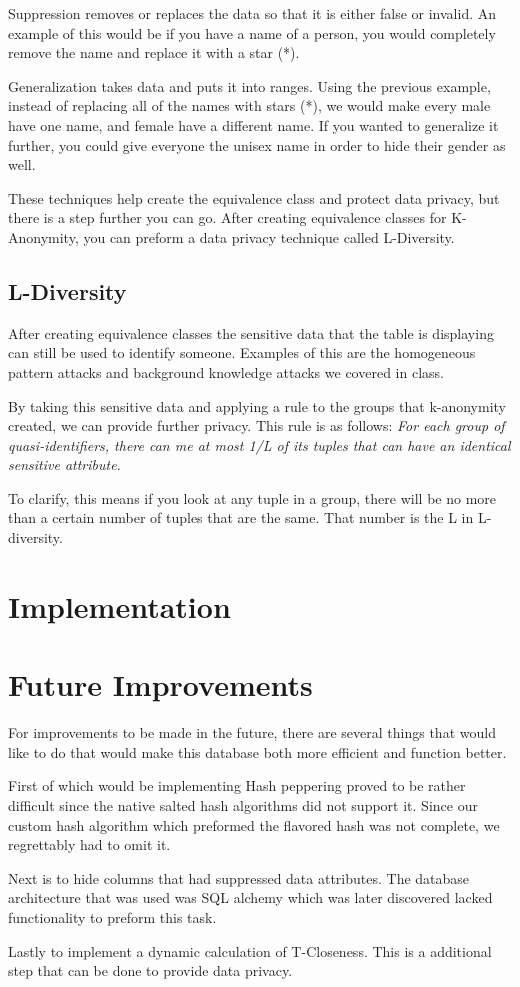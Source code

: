 \documentclass[12pt]{article}
\begin{document}
Suppression removes or replaces the data so that it is either false or invalid. An example of this would be if you have a name of a person, you would completely remove the name and replace it with a star (*). 

Generalization takes data and puts it into ranges. Using the previous example, instead of replacing all of the names with stars (*), we would make every male have one name, and female have a different name. If you wanted to generalize it further, you could give everyone the unisex name in order to hide their gender as well.  

These techniques help create the equivalence class and protect data privacy, but there is a step further you can go. After creating equivalence classes for K-Anonymity, you can preform a data privacy technique called L-Diversity. 

\subsection{\indent L-Diversity}
After creating equivalence classes the sensitive data that the table is displaying can still be used to identify someone. Examples of this are the homogeneous pattern attacks and background knowledge attacks we covered in class. 

By taking this sensitive data and applying a rule to the groups that k-anonymity created, we can provide further privacy. This rule is as follows: 
\textit{For each group of quasi-identifiers, there can me at most 1/L of its tuples that can have an identical sensitive attribute.}

To clarify, this means if you look at any tuple in a group, there will be no more than a certain number of tuples that are the same. That number is the L in L-diversity. 

\section{Implementation}

\section{Future Improvements}
For improvements to be made in the future, there are several things that would like to do that would make this database both more efficient and function better. 

First of which would be implementing Hash peppering proved to be rather difficult since the native salted hash algorithms did not support it. Since our custom hash algorithm which preformed the flavored hash was not complete, we regrettably had to omit it. 

Next is to hide columns that had suppressed data attributes. The database architecture that was used was SQL alchemy which was later discovered lacked functionality to preform this task. 

Lastly to implement a dynamic calculation of T-Closeness. This is a additional step that can be done to provide data privacy.
\end{document}
